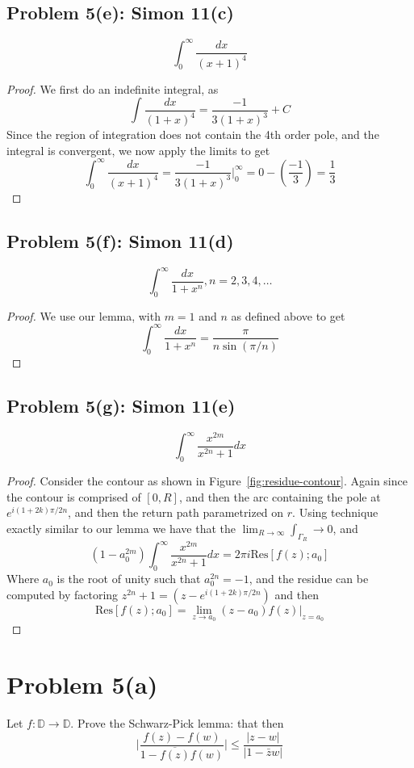 \documentclass{article}[12pt]
\def\DD{\mathbb D}
\begin{document}
\subsection*{Problem 5(e): Simon 11(c)}
\[
\int_0^\infty \frac{dx}{(x+1)^4}
\]
\begin{proof}
We first do an indefinite integral, as
\[
\int \frac{dx}{(1+x)^4} = \frac{-1}{3(1+x)^3} + C
\]
Since the region of integration does not contain the
4th order pole, and the integral is convergent, we now
apply the limits to get
\[
\int_0^\infty \frac{dx}{(x+1)^4} = \frac{-1}{3(1+x)^3}\rvert_0^\infty = 
0-(\frac{-1}{3})=\frac{1}{3}
\]



\end{proof}

\subsection*{Problem 5(f): Simon 11(d)}
\[
\int_0^\infty \frac{dx}{1+x^n}, n=2,3,4,\ldots
\]
\begin{proof}
We use our lemma, with $m=1$ and $n$ as defined above to get
\[
\int_0^\infty \frac{dx}{1+x^n} = \frac{\pi}{n\sin(\pi/n)}
\]
\end{proof}

\subsection*{Problem 5(g): Simon 11(e)}
\[
\int_0^\infty \frac{x^{2m} }{x^{2n}+1} dx 
\]
\begin{proof}
Consider the contour as shown in Figure~\ref{fig:residue-contour}.
Again since the contour is comprised of $[0,R]$, and then
the arc containing the pole at $e^{i(1+2k)\pi/2n}$, and then the return
path parametrized on $r$. Using technique exactly similar to our
lemma we have that the $\lim_{R\to\infty} \int_{\Gamma_R}\to 0$, and
\[
(1-a_0^{2m})\int_0^\infty \frac{x^{2m} }{x^{2n}+1} dx = 2\pi i\mbox{Res}[f(z);a_0]
\]
Where $a_0$ is the root of unity such that $a_0^{2n}=-1$, and the
residue can be computed by factoring $z^{2n}+1=(z-e^{i(1+2k)\pi/2n})$
and then
\[
\mbox{Res}[f(z);a_0] = \lim_{z\to a_0} (z-a_0)f(z)|_{z=a_0}
\]

\end{proof}


\section*{Problem 5(a)}
Let $f:\DD\to\DD$. Prove the Schwarz-Pick lemma: that then
\[
\lvert \frac{f(z)-f(w)}{1-\overline{f(z)}f(w)}\rvert \le
\frac{\lvert z-w\rvert}{\lvert 1-\bar{z}w\rvert}
\]
\end{document}
